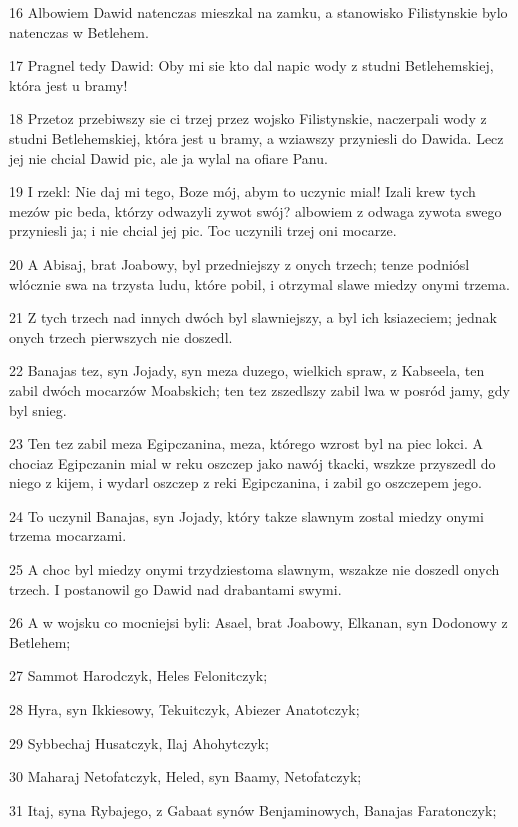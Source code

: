 \par 16 Albowiem Dawid natenczas mieszkal na zamku, a stanowisko Filistynskie bylo natenczas w Betlehem.
\par 17 Pragnel tedy Dawid: Oby mi sie kto dal napic wody z studni Betlehemskiej, która jest u bramy!
\par 18 Przetoz przebiwszy sie ci trzej przez wojsko Filistynskie, naczerpali wody z studni Betlehemskiej, która jest u bramy, a wziawszy przyniesli do Dawida. Lecz jej nie chcial Dawid pic, ale ja wylal na ofiare Panu.
\par 19 I rzekl: Nie daj mi tego, Boze mój, abym to uczynic mial! Izali krew tych mezów pic beda, którzy odwazyli zywot swój? albowiem z odwaga zywota swego przyniesli ja; i nie chcial jej pic. Toc uczynili trzej oni mocarze.
\par 20 A Abisaj, brat Joabowy, byl przedniejszy z onych trzech; tenze podniósl wlócznie swa na trzysta ludu, które pobil, i otrzymal slawe miedzy onymi trzema.
\par 21 Z tych trzech nad innych dwóch byl slawniejszy, a byl ich ksiazeciem; jednak onych trzech pierwszych nie doszedl.
\par 22 Banajas tez, syn Jojady, syn meza duzego, wielkich spraw, z Kabseela, ten zabil dwóch mocarzów Moabskich; ten tez zszedlszy zabil lwa w posród jamy, gdy byl snieg.
\par 23 Ten tez zabil meza Egipczanina, meza, którego wzrost byl na piec lokci. A chociaz Egipczanin mial w reku oszczep jako nawój tkacki, wszkze przyszedl do niego z kijem, i wydarl oszczep z reki Egipczanina, i zabil go oszczepem jego.
\par 24 To uczynil Banajas, syn Jojady, który takze slawnym zostal miedzy onymi trzema mocarzami.
\par 25 A choc byl miedzy onymi trzydziestoma slawnym, wszakze nie doszedl onych trzech. I postanowil go Dawid nad drabantami swymi.
\par 26 A w wojsku co mocniejsi byli: Asael, brat Joabowy, Elkanan, syn Dodonowy z Betlehem;
\par 27 Sammot Harodczyk, Heles Felonitczyk;
\par 28 Hyra, syn Ikkiesowy, Tekuitczyk, Abiezer Anatotczyk;
\par 29 Sybbechaj Husatczyk, Ilaj Ahohytczyk;
\par 30 Maharaj Netofatczyk, Heled, syn Baamy, Netofatczyk;
\par 31 Itaj, syna Rybajego, z Gabaat synów Benjaminowych, Banajas Faratonczyk;

